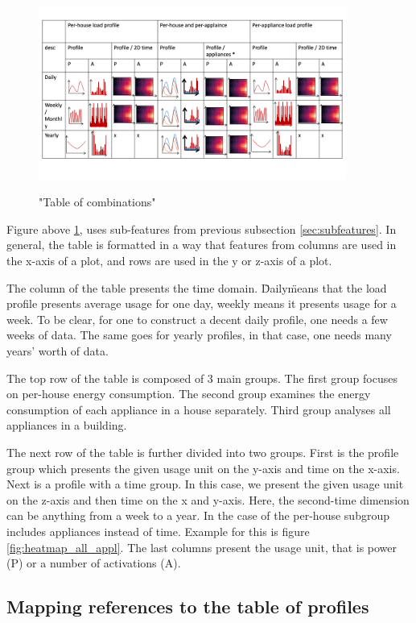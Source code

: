 \begin{figure}[H]
	\centering
	\caption{"Table of combinations"}
	\includegraphics[width=0.9\textwidth]{Figures/profile_sketches/Slide14.png}
	\label{fig:map_fig}
\end{figure}

Figure above \ref{fig:map_fig}, uses sub-features from previous subsection \ref{sec:subfeatures}. 
In general, the table is formatted in a way that features from columns are
used in the x-axis of a plot, and rows are used in the y or z-axis of a plot. 

The column of the table presents the time domain. \"Daily\" means that the load profile presents
average usage for one day, weekly means it presents usage for a week.
To be clear, for one to construct a decent daily profile, one needs a few
weeks of data. The same goes for yearly profiles, in that case, one needs many years' worth of data. 

The top row of the table is composed of 3 main groups. 
The first group focuses on per-house energy consumption.
The second group examines the energy consumption of each appliance in a house separately.
Third group analyses all appliances in a building.

The next row of the table is further divided into two groups. First is the profile group
which presents the given usage unit on the y-axis and time on the x-axis. 
Next is a profile with a time group. 
In this case, we present the given usage unit on the z-axis and then time on the x and y-axis.
Here, the second-time dimension can be anything from a week to a year.
In the case of the per-house subgroup includes appliances instead of time. 
Example for this is figure \ref{fig:heatmap_all_appl}.
The last columns present the usage unit, that is power (P) or a number of activations (A).

\subsection{Mapping references to the table of profiles}

